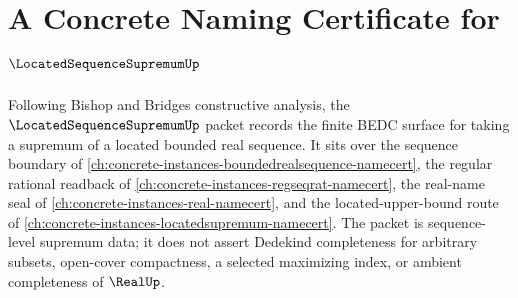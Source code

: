 \chapter{A Concrete Naming Certificate for $\LocatedSequenceSupremumUp$}
\label{ch:concrete-instances-located-sequence-supremum-namecert}

Following Bishop and Bridges constructive analysis, the $\LocatedSequenceSupremumUp$ packet records the finite BEDC surface for taking a supremum of a located bounded real sequence. It sits over the sequence boundary of \autoref{ch:concrete-instances-boundedrealsequence-namecert}, the regular rational readback of \autoref{ch:concrete-instances-regseqrat-namecert}, the real-name seal of \autoref{ch:concrete-instances-real-namecert}, and the located-upper-bound route of \autoref{ch:concrete-instances-locatedsupremum-namecert}. The packet is sequence-level supremum data; it does not assert Dedekind completeness for arbitrary subsets, open-cover compactness, a selected maximizing index, or ambient completeness of $\RealUp$.

